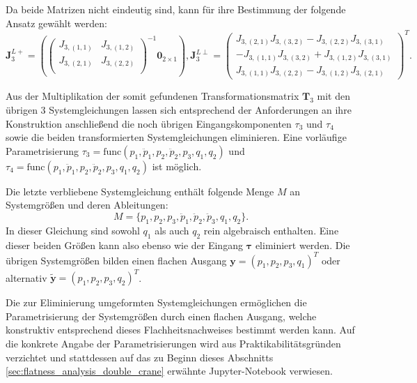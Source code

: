 Da beide Matrizen nicht eindeutig sind, kann für ihre Bestimmung der folgende Ansatz gewählt werden: 
\begin{equation}
	\mathbf{J}_3^{L+} =
	\left(
	\left(\begin{matrix}
		J_{3, (1,1)} & J_{3, (1,2)}\\
		J_{3, (2,1)} & J_{3, (2,2)}\\
	\end{matrix}\right)^{-1}	
	\mathbf{0}_{2 \times 1}
	\right), 		
	\mathbf{J}_3^{L\perp} =
	\left(\begin{matrix}
		J_{3, (2,1)} J_{3, (3,2)} - J_{3, (2,2)} J_{3, (3,1)} \\
		-J_{3, (1,1)} J_{3, (3,2)} + J_{3, (1,2)} J_{3, (3,1)} \\
		J_{3, (1,1)} J_{3, (2,2)} - J_{3, (1,2)} J_{3, (2,1)}
	\end{matrix}\right)^T.
\end{equation}

Aus der Multiplikation der somit gefundenen Transformationsmatrix $\mathbf{T}_3$ mit den übrigen 3 Systemgleichungen lassen sich entsprechend der Anforderungen an ihre Konstruktion anschließend die noch übrigen Eingangskomponenten $\tau_{3}$ und $\tau_{4}$ sowie die beiden transformierten Systemgleichungen eliminieren. Eine vorläufige Parametrisierung ${\tau_3 = \mathrm{func}(p_1, \ddot{p}_1, p_2, \ddot{p}_2, p_3, q_1, q_2)}$ und ${\tau_4 = \mathrm{func}(p_1, \ddot{p}_1, p_2, \ddot{p}_2, p_3, q_1, q_2)}$ ist möglich.

Die letzte verbliebene Systemgleichung enthält folgende Menge $M$ an Systemgrößen und deren Ableitungen:
\begin{equation}
	M = \{p_1, p_2, p_3, \ddot{p}_1, \ddot{p}_2, \ddot{p}_3, q_1, q_2 \}.
\end{equation}
In dieser Gleichung sind sowohl $q_1$ als auch $q_2$ rein algebraisch enthalten. Eine dieser beiden Größen kann also ebenso wie der Eingang $\boldsymbol{\tau}$ eliminiert werden. Die übrigen Systemgrößen bilden einen flachen Ausgang $\mathbf{y} = (p_1, p_2, p_3, q_1)^T$ oder alternativ ${\tilde{\mathbf{y}} = (p_1, p_2, p_3, q_2)^T}$.

Die zur Eliminierung umgeformten Systemgleichungen ermöglichen die Parametrisierung der Systemgrößen durch einen flachen Ausgang, welche konstruktiv entsprechend dieses Flachheitsnachweises bestimmt werden kann. Auf die konkrete Angabe der Parametrisierungen wird aus Praktikabilitätsgründen verzichtet und stattdessen auf das zu Beginn dieses Abschnitts \ref{sec:flatness_analysis_double_crane} erwähnte Jupyter-Notebook verwiesen.


